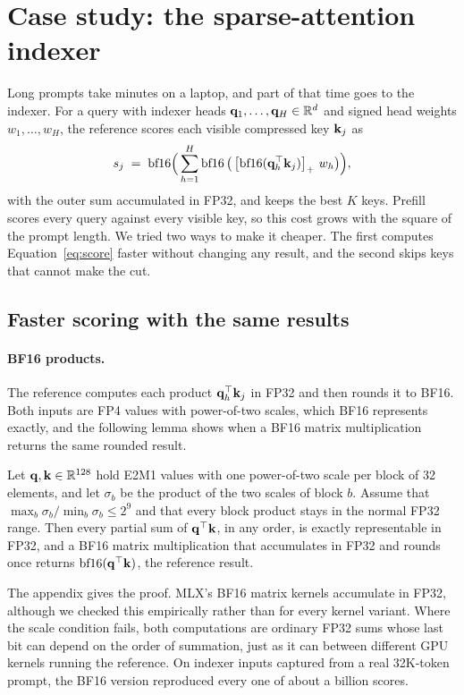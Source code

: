 \section{Case study: the sparse-attention indexer}
\label{sec:indexer}
Long prompts take minutes on a laptop, and part of that time goes to the indexer. For a query with indexer heads $\mathbf q_1,\dots,\mathbf q_H\in\mathbb R^{d}$ and signed head weights $w_1,\dots,w_H$, the reference scores each visible compressed key $\mathbf k_j$ as
\begin{equation}
s_j \;=\; \operatorname{bf16}\!\Big(\sum_{h=1}^{H} \operatorname{bf16}\big(\left[\operatorname{bf16}(\mathbf q_h^\top\mathbf k_j)\right]_{+}\, w_h\big)\Big),
\label{eq:score}
\end{equation}
with the outer sum accumulated in FP32, and keeps the best $K$ keys. Prefill scores every query against every visible key, so this cost grows with the square of the prompt length. We tried two ways to make it cheaper. The first computes Equation~\eqref{eq:score} faster without changing any result, and the second skips keys that cannot make the cut.

\subsection{Faster scoring with the same results}
\paragraph{BF16 products.} The reference computes each product $\mathbf q_h^\top\mathbf k_j$ in FP32 and then rounds it to BF16. Both inputs are FP4 values with power-of-two scales, which BF16 represents exactly, and the following lemma shows when a BF16 matrix multiplication returns the same rounded result.
\begin{lemma}
\label{lem:exact}
Let $\mathbf q,\mathbf k\in\mathbb R^{128}$ hold E2M1 values with one power-of-two scale per block of 32 elements, and let $\sigma_b$ be the product of the two scales of block $b$. Assume that $\max_b\sigma_b/\min_b\sigma_b\le 2^{9}$ and that every block product stays in the normal FP32 range. Then every partial sum of $\mathbf q^\top\mathbf k$, in any order, is exactly representable in FP32, and a BF16 matrix multiplication that accumulates in FP32 and rounds once returns $\operatorname{bf16}(\mathbf q^\top\mathbf k)$, the reference result.
\end{lemma}
The appendix gives the proof. MLX's BF16 matrix kernels accumulate in FP32, although we checked this empirically rather than for every kernel variant. Where the scale condition fails, both computations are ordinary FP32 sums whose last bit can depend on the order of summation, just as it can between different GPU kernels running the reference. On indexer inputs captured from a real 32K-token prompt, the BF16 version reproduced every one of about a billion scores.

